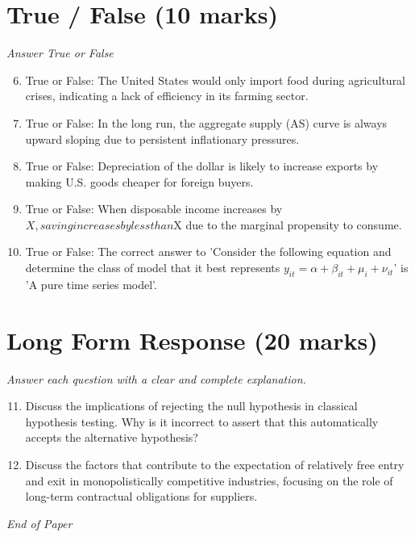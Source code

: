 \documentclass[12pt]{article}
\begin{document}
\section*{True / False (10 marks)}
\textit{Answer True or False}
\begin{enumerate}[label=\arabic*.]
\setcounter{enumi}{5}
\item True or False: The United States would only import food during agricultural crises, indicating a lack of efficiency in its farming sector.
\item True or False: In the long run, the aggregate supply (AS) curve is always upward sloping due to persistent inflationary pressures.
\item True or False: Depreciation of the dollar is likely to increase exports by making U.S. goods cheaper for foreign buyers.
\item True or False: When disposable income increases by $X, saving increases by less than $X due to the marginal propensity to consume.
\item True or False: The correct answer to 'Consider the following equation and determine the class of model that it best represents $y_{it} = \alpha + \beta_{it} + \mu_i + \nu_{it}$' is 'A pure time series model'.
\end{enumerate}

\section*{Long Form Response (20 marks)}
\textit{Answer each question with a clear and complete explanation.}
\begin{enumerate}[label=\arabic*.]
\setcounter{enumi}{10}
\item Discuss the implications of rejecting the null hypothesis in classical hypothesis testing. Why is it incorrect to assert that this automatically accepts the alternative hypothesis?
\item Discuss the factors that contribute to the expectation of relatively free entry and exit in monopolistically competitive industries, focusing on the role of long-term contractual obligations for suppliers.
\end{enumerate}

\vfill
\noindent\textit{End of Paper}
\end{document}
